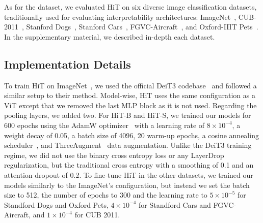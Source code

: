 As for the dataset, we evaluated HiT on six diverse image classification datasets, traditionally used for evaluating interpretability architectures: ImageNet~\cite{deng2009imagenet}, CUB-2011~\cite{WahCUB_200_2011}, Stanford Dogs~\cite{KhoslaYaoJayadevaprakashFeiFei_FGVC2011}, Stanford Cars~\cite{krause20133d}, FGVC-Aircraft~\cite{maji13fine-grained}, and Oxford-IIIT Pets~\cite{parkhi12a}. In the supplementary material, we described in-depth each dataset. 





\subsection{Implementation Details}


To train HiT on ImageNet~\cite{deng2009imagenet}, we used the official DeiT3 codebase~\cite{Touvron2022DeiTIR} and followed a similar setup to their method. 
Model-wise, HiT uses the same configuration as a ViT except that we removed the last MLP block as it is not used. 
Regarding the pooling layers, we added two.
For HiT-B and HiT-S, we trained our models for 600 epochs using the AdamW optimizer~\cite{loshchilov2018decoupled} with a learning rate of $8\times10^{-4}$, a weight decay of 0.05, a batch size of 4096, 20 warm-up epochs, a cosine annealing scheduler~\cite{loshchilov2017sgdr}, and ThreeAugment~\cite{Touvron2022DeiTIR} data augmentation. 
Unlike the DeiT3 training regime, we did not use the binary cross entropy loss or any LayerDrop~\cite{Fan2020Reducing} regularization, but the traditional cross entropy with a smoothing of 0.1 and an attention dropout of 0.2.
To fine-tune HiT in the other datasets, we trained our models similarly to the ImageNet's configuration, but instead we set the batch size to 512, the number of epochs to 300 and the learning rate to $5\times10^{-5}$ for Standford Dogs and Oxford Pets, $4\times10^{-4}$ for Standford Cars and FGVC-Aircraft, and $1\times10^{-4}$ for CUB 2011.






